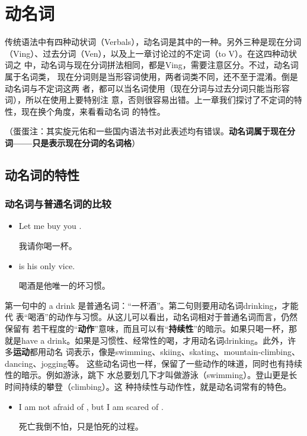 \chapter{动名词}

传统语法中有四种动状词（Verbals），动名词是其中的一种。另外三种是现在分词
（Ving）、过去分词（Ven），以及上一章讨论过的不定词（to V）。在这四种动状词之
中，动名词与现在分词拼法相同，都是Ving，需要注意区分。不过，动名词属于名词类，
现在分词则是当形容词使用，两者词类不同，还不至于混淆。倒是动名词与不定词这两
者，都可以当名词使用（现在分词与过去分词只能当形容词），所以在使用上要特别注
意，否则很容易出错。上一章我们探讨了不定词的特性，现在换个角度，来看看动名词
的特性。

（蛋蛋注：其实旋元佑和一些国内语法书对此表述均有错误。\textbf{动名词属于现在分
  词——只是表示现在分词的名词格}）

\section{动名词的特性}

\subsection{动名词与普通名词的比较}

\begin{itemize}
\item Let me buy you .

  我请你喝一杯。
\item {} is his only vice.

  喝酒是他唯一的坏习惯。
\end{itemize}

第一句中的 a drink 是普通名词：“一杯酒”。第二句则要用动名词drinking，才能代
表“喝酒”的动作与习惯。从这儿可以看出，动名词相对于普通名词而言，仍然保留有
若干程度的“\textbf{动作}”意味，而且可以有“\textbf{持续性}”的暗示。如果只喝一杯，那就是have
a drink。如果是习惯性、经常性的喝，才用动名词drinking。此外，许多\textbf{运动}都用动名
词表示，像是swimming、skiing、skating、mountain-climbing、dancing、jogging等。
这些动名词也一样，保留了一些动作的味道，同时也有持续性的暗示。例如游泳，跳下
水总要划几下才叫做游泳（swimming）。登山更是长时间持续的攀登（climbing）。这
种持续性与动作性，就是动名词常有的特色。

\begin{itemize}
\item I am not afraid of , but I am scared of .

  死亡我倒不怕，只是怕死的过程。
\end{itemize}

